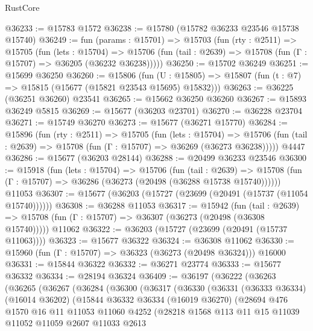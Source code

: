 \begin{lexlean}{RustCore}
\begin{coremodule}
@36233 := @15783 @1572
@36238 := @15780 (@15782 @36233 @23546 @15738 @15740)
@36249 := fun (params : @15701) =>
  @15703
    (fun (rty : @2511) =>
    @15705
      (fun (lets : @15704) =>
      @15706 (fun (tail : @2639) => @15708 (fun (Γ : @15707) => @36205 (@36232 @36238)))))
@36250 := @15702 @36249
@36251 := @15699 @36250
@36260 := @15806
    (fun (U : @15805) => @15807 (fun (t : @7) => @15815 (@15677 (@15821 @23543 @15695) @15832)))
@36263 := @36225 (@36251 @36260) @23541
@36265 := @15662 @36250 @36260
@36267 := @15893 @36249 @5815
@36269 := @15677 (@36203 @23701)
@36270 := @36228 @23704
@36271 := @15749 @36270
@36273 := @15677 (@36271 @15770)
@36284 := @15896
    (fun (rty : @2511) =>
    @15705
      (fun (lets : @15704) =>
      @15706 (fun (tail : @2639) => @15708 (fun (Γ : @15707) => @36269 (@36273 @36238)))))
    @4447
@36286 := @15677 (@36203 @28144)
@36288 := @20499 @36233 @23546
@36300 := @15918
    (fun (lets : @15704) =>
    @15706
      (fun (tail : @2639) =>
      @15708 (fun (Γ : @15707) => @36286 (@36273 (@20498 (@36288 @15738 @15740))))))
    @11053
@36307 := @15677 (@36203 (@15727 (@23699 (@20491 (@15737 (@11054 @15740))))))
@36308 := @36288 @11053
@36317 := @15942
    (fun (tail : @2639) => @15708 (fun (Γ : @15707) => @36307 (@36273 (@20498 (@36308 @15740)))))
    @11062
@36322 := @36203 (@15727 (@23699 (@20491 (@15737 @11063))))
@36323 := @15677 @36322
@36324 := @36308 @11062
@36330 := @15960 (fun (Γ : @15707) => @36323 (@36273 (@20498 @36324))) @16000
@36331 := @15844 @36322
@36332 := @36271 @23774
@36333 := @15677 @36332
@36334 := @28194 @36324
@36409 := @36197
    (@36222
      (@36263
        (@36265
          (@36267
            (@36284
              (@36300
                (@36317
                  (@36330
                    (@36331
                      (@36333 @36334)
                      (@16014 @36202)
                      (@15844
                        @36332
                        @36334
                        (@16019 @36270)
                        (@28694
                          @476
                          @1570
                          @16
                          @11
                          @11053
                          @11060
                          @4252
                          (@28218
                            @1568
                            @113
                            @11
                            @15
                            @11039
                            @11052
                            @11059
                            @2607
                            @11033
                            @2613

\end{coremodule}
\end{lexlean}
